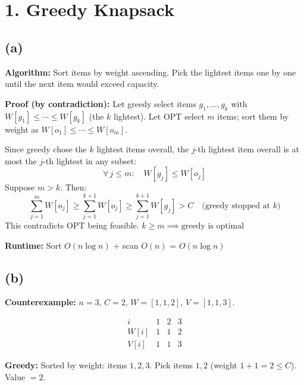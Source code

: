 \documentclass[11pt]{article}
\begin{document}
\section*{1. Greedy Knapsack}

\subsection*{(a)}

\textbf{Algorithm:} Sort items by weight ascending. Pick the lightest items one by one until the next item would exceed capacity.

\begin{algorithm}[H]
\DontPrintSemicolon
{}
\end{algorithm}

\textbf{Proof (by contradiction):}
Let greedy select items $g_1, \ldots, g_k$ with $W[g_1] \le \cdots \le W[g_k]$ (the $k$ lightest).
Let OPT select $m$ items; sort them by weight as $W[o_1] \le \cdots \le W[o_m]$.

Since greedy chose the $k$ lightest items overall, the $j$-th lightest item overall is at most the $j$-th lightest in any subset:
\[
\forall\, j \le m: \quad W[g_j] \le W[o_j]
\]
Suppose $m > k$. Then:
\[
\sum_{j=1}^{m} W[o_j] \ge \sum_{j=1}^{k+1} W[o_j] \ge \sum_{j=1}^{k+1} W[g_j] > C \quad \text{(greedy stopped at } k\text{)}
\]
This contradicts OPT being feasible. \quad $\boxed{k \ge m \implies \text{greedy is optimal}}$

\textbf{Runtime:} Sort $O(n \log n)$ + scan $O(n)$ = $\boxed{O(n \log n)}$

\subsection*{(b)}

\textbf{Counterexample:} $n = 3$, $C = 2$, $W = [1, 1, 2]$, $V = [1, 1, 3]$.

\[
\begin{array}{c|ccc}
i & 1 & 2 & 3 \\ \hline
W[i] & 1 & 1 & 2 \\
V[i] & 1 & 1 & 3
\end{array}
\]

\textbf{Greedy:} Sorted by weight: items $1, 2, 3$. Pick items $1, 2$ (weight $1 + 1 = 2 \le C$). Value $= 2$.
\end{document}
